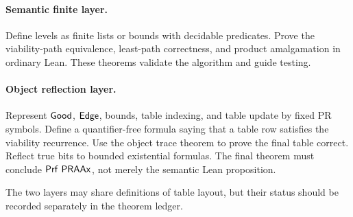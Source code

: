 \paragraph{Semantic finite layer.}
Define levels as finite lists or bounds with decidable predicates.  Prove the viability-path equivalence, least-path correctness, and product amalgamation in ordinary Lean.  These theorems validate the algorithm and guide testing.

\paragraph{Object reflection layer.}
Represent \(\mathsf{Good}\), \(\mathsf{Edge}\), bounds, table indexing, and table update by fixed PR symbols.  Define a quantifier-free formula saying that a table row satisfies the viability recurrence.  Use the object trace theorem to prove the final table correct.  Reflect true bits to bounded existential formulas.  The final theorem must conclude \(\mathsf{Prf}\ \mathsf{PRAAx}\), not merely the semantic Lean proposition.

The two layers may share definitions of table layout, but their status should be recorded separately in the theorem ledger.
